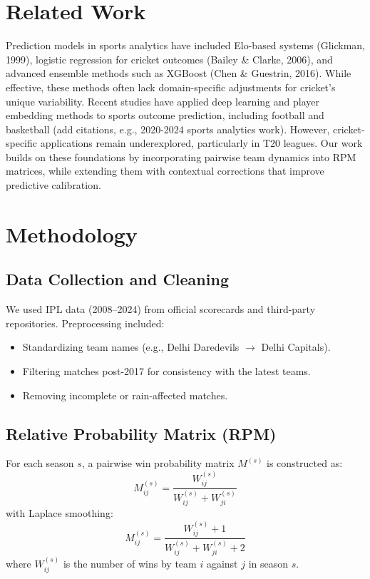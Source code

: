 \documentclass{article}
\begin{document}
\section{Related Work}
Prediction models in sports analytics have included Elo-based systems (Glickman, 1999), logistic regression for cricket outcomes (Bailey \& Clarke, 2006), and advanced ensemble methods such as XGBoost (Chen \& Guestrin, 2016). While effective, these methods often lack domain-specific adjustments for cricket's unique variability. Recent studies have applied deep learning and player embedding methods to sports outcome prediction, including football and basketball (add citations, e.g., 2020-2024 sports analytics work). However, cricket-specific applications remain underexplored, particularly in T20 leagues. Our work builds on these foundations by incorporating pairwise team dynamics into RPM matrices, while extending them with contextual corrections that improve predictive calibration.

\section{Methodology}

\subsection{Data Collection and Cleaning}
We used IPL data (2008--2024) from official scorecards and third-party repositories. Preprocessing included:
\begin{itemize}
    \item Standardizing team names (e.g., Delhi Daredevils $\rightarrow$ Delhi Capitals).
    \item Filtering matches post-2017 for consistency with the latest teams.
    \item Removing incomplete or rain-affected matches.
\end{itemize}

\subsection{Relative Probability Matrix (RPM)}
For each season $s$, a pairwise win probability matrix $M^{(s)}$ is constructed as:
$$M_{ij}^{(s)}=\frac{W_{ij}^{(s)}}{W_{ij}^{(s)}+W_{ji}^{(s)}}$$
with Laplace smoothing:
$$M_{ij}^{(s)}=\frac{W_{ij}^{(s)}+1}{W_{ij}^{(s)}+W_{ji}^{(s)}+2}$$
where $W_{ij}^{(s)}$ is the number of wins by team $i$ against $j$ in season $s$.
\end{document}
